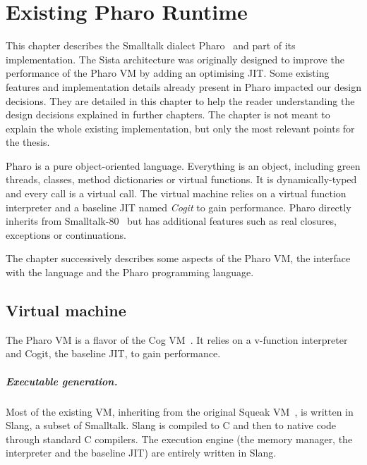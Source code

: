 \documentclass[a4paper,12pt,twoside]{../includes/ThesisStyle}
\begin{document}
\fi

\chapter{Existing Pharo Runtime}
\label{chap:existing}
\minitoc

This chapter describes the Smalltalk dialect Pharo~\cite{Blac09a} and part of its implementation. The Sista architecture was originally designed to improve the performance of the Pharo VM by adding an optimising JIT. Some existing features and implementation details already present in Pharo impacted our design decisions. They are detailed in this chapter to help the reader understanding the design decisions explained in further chapters. The chapter is not meant to explain the whole existing implementation, but only the most relevant points for the thesis. 

Pharo is a pure object-oriented language. Everything is an object, including green threads, classes, method dictionaries or virtual functions. It is dynamically-typed and every call is a virtual call. The virtual machine relies on a virtual function interpreter and a baseline JIT named \emph{Cogit} to gain performance. Pharo directly inherits from Smalltalk-80~\cite{Gold83a} but has additional features such as real closures, exceptions or continuations.

The chapter successively describes some aspects of the Pharo VM, the interface with the language and the Pharo programming language.


\section{Virtual machine}

The Pharo VM is a flavor of the Cog VM~\cite{Mira08a}. It relies on a v-function interpreter and Cogit, the baseline JIT, to gain performance.

\paragraph{Executable generation.}
Most of the existing VM, inheriting from the original Squeak VM~\cite{Inga97a}, is written in Slang, a subset of Smalltalk. Slang is compiled to C and then to native code through standard C compilers. The execution engine (the memory manager, the interpreter and the baseline JIT) are entirely written in Slang.
\end{document}
